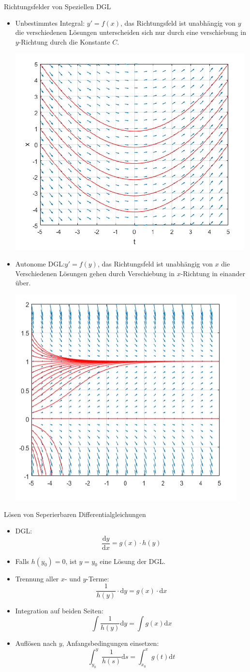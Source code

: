 \begin{definition}{Richtungsfelder von Speziellen DGL}\\
  \begin{itemize}
    \item Unbestimmtes Integral: \(y'=f(x)\), das Richtungsfeld ist unabhängig von \(y\) die verschiedenen Lösungen
      unterscheiden sich nur durch eine verschiebung in \(y\)-Richtung durch die Konstante \(C\).
  \begin{center}
  \includegraphics[width=0.4\linewidth]{images/UnbestimmtesIntegral.png}
  \end{center}
\item Autonome DGL:\(y'=f(y)\), das Richtungsfeld ist unabhängig von \(x\) die Verschiedenen Lösungen gehen durch
  Verschiebung in \(x\)-Richtung in einander über.
  \begin{center}
  \includegraphics[width=0.4\linewidth]{images/AutonomeDGL.png}
  \end{center}
  \end{itemize}
\end{definition}
\begin{KR}{Lösen von Seperierbaren Differentialgleichungen}\\
  \begin{itemize}
    \item DGL:
      \[\frac{\mathrm{d}y}{\mathrm{d}x}=g(x)\cdot h(y)\]
    \item Falls \(h(y_0)=0\), ist \(y=y_0\) eine Lösung der DGL.
    \item Trennung aller \(x\)- und \(y\)-Terme:
      \[\frac{1}{h(y)}\cdot \mathrm{d}y=g(x)\cdot \mathrm{d}x\]
    \item Integration auf beiden Seiten:
      \[\int{\frac{1}{h(y)}\mathrm{d}y}=\int{g(x)\mathrm{d}x}\]
    \item Auflösen nach \(y\), Anfangsbedingungen einsetzen:
      \[\int_{y_0}^{y}{\frac{1}{h(s)}\mathrm{d}s}=\int_{x_0}^{x}{g(t)\mathrm{d}t}\]
  \end{itemize}
\end{KR}
